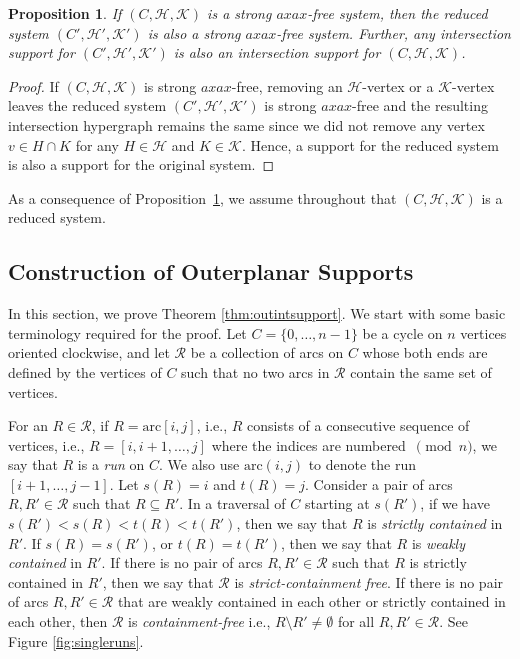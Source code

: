 \documentclass[12pt]{article}
\newcommand{\HH}{\mathcal{H}}
\newcommand{\KK}{\mathcal{K}}
\newcommand{\arc}{\mathrm{arc}}
\newtheorem{proposition}[theorem]{Proposition}
\theoremstyle{case}
\begin{document}
\begin{proposition}\label{prop:reducedsystem}
If $(C,\mathcal{H,K})$ is a strong $axax$-free system, 
then the reduced system $(C',\mathcal{H',K'})$ is also a strong $axax$-free system.
Further, any intersection support for $(C',\mathcal{H',K'})$ is also an intersection support for $(C,\mathcal{H,K})$.
\end{proposition}
\begin{proof}
If $(C,\HH,\KK)$ is strong $axax$-free, removing an $\mathcal{H}$-vertex or a $\mathcal{K}$-vertex leaves the reduced system $(C',\HH',\KK')$ is strong 
$axax$-free and the resulting intersection hypergraph remains the same since we did not remove any vertex $v\in H\cap K$ for any $H\in\HH$ and $K\in\KK$.
Hence, a support for the reduced system is also a support for the original system.
\end{proof}

As a consequence of Proposition~\ref{prop:reducedsystem}, 
we assume throughout that $(C,\mathcal{H},\mathcal{K})$ is a reduced system.

\subsection{Construction of Outerplanar Supports}\label{sec:construction-opsupport}
In this section, we prove Theorem \ref{thm:outintsupport}.
We start with some basic terminology required for the proof.
Let $C=\{0,\ldots, n-1\}$ be a cycle on $n$ vertices oriented clockwise, and let $\mathcal{R}$ be a collection of arcs on $C$ whose both ends are defined by the vertices of $C$ such
that no two arcs in $\mathcal{R}$ contain the same set of vertices.

For an $R\in\mathcal{R}$, if $R=\arc[i,j]$, i.e., $R$ consists of a 
consecutive sequence of vertices, i.e., 
$R=[i, i+1, \ldots, j]$ where the indices are numbered~$\pmod n$, 
we say that $R$ is a \emph{run} on $C$. We also use $\arc(i,j)$ to 
denote the run $[i+1,\ldots, j-1]$. 
Let $s(R)=i$ and $t(R)=j$.
Consider a pair of arcs $R, R'\in\mathcal{R}$ such that $R\subseteq R'$. In a traversal of $C$ starting at $s(R')$, if we have 
$s(R')<s(R)<t(R)<t(R')$, 
then we say that $R$ is \emph{strictly contained} in $R'$. If $s(R)=s(R')$, or 
$t(R)=t(R')$, then we say that $R$ is \emph{weakly contained} in $R'$. 
If there is no pair of arcs $R, R'\in\mathcal{R}$ such that $R$ is strictly contained in $R'$, then we say that
$\mathcal{R}$ is \emph{strict-containment free}. 
If there is no pair of arcs $R, R'\in\mathcal{R}$
that are weakly contained in each other or strictly contained in each other, then $\mathcal{R}$ is \emph{containment-free} i.e., $R\setminus R'\ne\emptyset$ for all $R,R'\in\mathcal{R}$. See Figure
\ref{fig:singleruns}.
\end{document}
